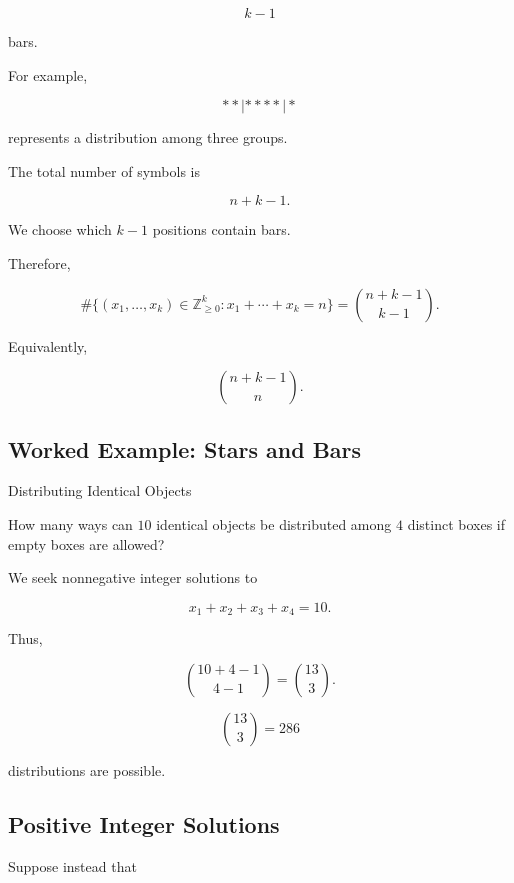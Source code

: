 \[
k-1
\]

bars.

For example,

\[
**|****|*
\]

represents a distribution among three groups.

The total number of symbols is

\[
n+k-1.
\]

We choose which \(k-1\) positions contain bars.

Therefore,

\[
\boxed{
\#\{(x_1,\ldots,x_k)\in\mathbb{Z}_{\geq0}^k:
x_1+\cdots+x_k=n\}
=
\binom{n+k-1}{k-1}.
}
\]

Equivalently,

\[
\boxed{
\binom{n+k-1}{n}.
}
\]

\subsection{Worked Example: Stars and Bars}
\label{subsec:worked-stars-and-bars}

\begin{workedexamplebox}{Distributing Identical Objects}

How many ways can \(10\) identical objects be distributed among \(4\)
distinct boxes if empty boxes are allowed?

We seek nonnegative integer solutions to

\[
x_1+x_2+x_3+x_4=10.
\]

Thus,

\[
\binom{10+4-1}{4-1}
=
\binom{13}{3}.
\]

\begin{answerbox}
\[
\boxed{
\binom{13}{3}=286
}
\]

distributions are possible.
\end{answerbox}

\end{workedexamplebox}

\subsection{Positive Integer Solutions}
\label{subsec:positive-integer-solutions}

Suppose instead that

